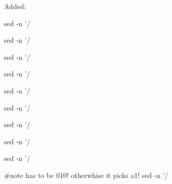 


Added:
\begin{quote}

\end{quote}


sed -n '/%

sed -n '/%

sed -n '/%

sed -n '/%

sed -n '/%

sed -n '/%

sed -n '/%

sed -n '/%

sed -n '/%

#note has to be 010! otherwhise it picks a1!
sed -n '/%















